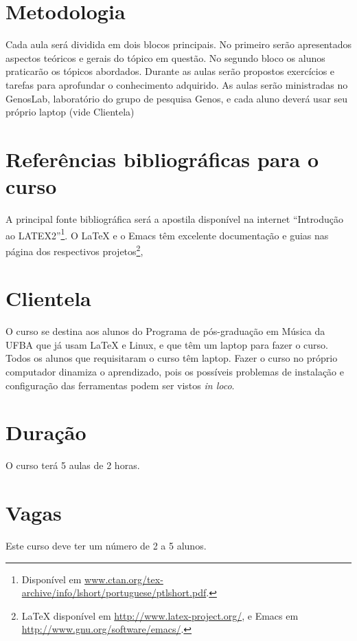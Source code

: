 \documentclass[12pt,brazil]{article}
\begin{document}
\section{Metodologia}

Cada aula será dividida em dois blocos principais. No primeiro serão
apresentados aspectos teóricos e gerais do tópico em questão. No
segundo bloco os alunos praticarão os tópicos abordados. Durante as
aulas serão propostos exercícios e tarefas para aprofundar o
conhecimento adquirido. As aulas serão ministradas no GenosLab,
laboratório do grupo de pesquisa Genos, e cada aluno deverá usar seu
próprio laptop (vide Clientela)

\section{Referências bibliográficas para o curso}

A principal fonte bibliográfica será a apostila disponível na internet
``Introdução ao LATEX2''\footnote{Disponível em
  \url{www.ctan.org/tex-archive/info/lshort/portuguese/ptlshort.pdf}.}. O
\LaTeX{} e o Emacs têm excelente documentação e guias nas página dos
respectivos projetos\footnote{\LaTeX{} disponível em
  \url{http://www.latex-project.org/}, e Emacs em
  \url{http://www.gnu.org/software/emacs/}.},

\section{Clientela}

O curso se destina aos alunos do Programa de pós-graduação em Música
da UFBA que já usam \LaTeX{} e Linux, e que têm um laptop para fazer o
curso. Todos os alunos que requisitaram o curso têm laptop. Fazer o
curso no próprio computador dinamiza o aprendizado, pois os possíveis
problemas de instalação e configuração das ferramentas podem ser
vistos \textit{in loco}.

\section{Duração}

O curso terá 5 aulas de 2 horas.
 
\section{Vagas}

Este curso deve ter um número de 2 a 5 alunos.
\end{document}
